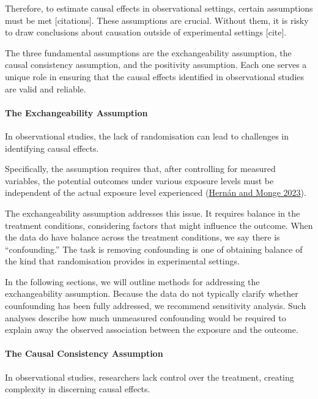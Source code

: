\documentclass[
  singlecolumn]{article}
\let\oldparagraph\paragraph
\renewcommand{\paragraph}[1]{\oldparagraph{#1}\mbox{}}
\begin{document}
Therefore, to estimate causal effects in observational settings, certain
assumptions must be met {[}citations{]}. These assumptions are crucial.
Without them, it is risky to draw conclusions about causation outside of
experimental settings {[}cite{]}.

The three fundamental assumptions are the exchangeability assumption,
the causal consistency assumption, and the positivity assumption. Each
one serves a unique role in ensuring that the causal effects identified
in observational studies are valid and reliable.

\paragraph{\texorpdfstring{\textbf{The Exchangeability
Assumption}}{The Exchangeability Assumption}}\label{the-exchangeability-assumption}

In observational studies, the lack of randomisation can lead to
challenges in identifying causal effects.

Specifically, the assumption requires that, after controlling for
measured variables, the potential outcomes under various exposure levels
must be independent of the actual exposure level experienced
(\hyperref[ref-hernuxe1n2023]{Hernán and Monge 2023}).

The exchangeability assumption addresses this issue. It requires balance
in the treatment conditions, considering factors that might influence
the outcome. When the data do have balance across the treatment
conditions, we say there is ``confounding.'' The task is removing
confounding is one of obtaining balance of the kind that randomisation
provides in experimental settings.

In the following sections, we will outline methods for addressing the
exchangeability assumption. Because the data do not typically clarify
whether counfounding has been fully addressed, we recommend sensitivity
analysis. Such analyses describe how much unmeasured confounding would
be required to explain away the observed association between the
exposure and the outcome.

\paragraph{\texorpdfstring{\textbf{The Causal Consistency
Assumption}}{The Causal Consistency Assumption}}\label{the-causal-consistency-assumption}

In observational studies, researchers lack control over the treatment,
creating complexity in discerning causal effects.
\end{document}
